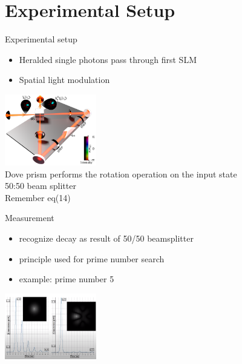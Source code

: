 \documentclass[aspectratio=169,9pt]{beamer}
\begin{document}
\section{Experimental Setup}
\begin{frame}[t]{Experimental setup}
  \begin{itemize}
    \item Heralded single photons pass through first SLM
    \item Spatial light modulation
  \end{itemize}
  \includegraphics[width=0.3\textwidth]{experimental_setup.png}\\
  Dove prism performs the rotation operation on the input state \\
  50:50 beam splitter \\
  Remember eq(14)
\end{frame}


\begin{frame}[t]{Measurement}
  \begin{itemize}
    \item recognize decay as result of 50/50 beamsplitter
    \item principle used for prime number search
    \item example: prime number 5
  \end{itemize}
  \includegraphics[width=0.3\textwidth]{example_measurement.png}
\end{frame}


\end{document}
